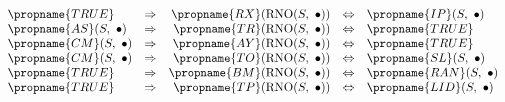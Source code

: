 \[
\begin{array}{lcrcl} 
\propname{TRUE}
	& \Rightarrow
	& \propname{RX}(\mathrm{RNO}(S,\ \bullet)) 
    & \Leftrightarrow
    & \propname{IP}(S,\ \bullet)  \\
\propname{AS}(S,\ \bullet)
	& \Rightarrow
	& \propname{TR}(\mathrm{RNO}(S,\ \bullet))
    & \Leftrightarrow
    & \propname{TRUE} \\
\propname{CM}(S,\ \bullet)
	& \Rightarrow
	& \propname{AY}(\mathrm{RNO}(S,\ \bullet))
    & \Leftrightarrow
    & \propname{TRUE} \\ 
\propname{CM}(S,\ \bullet)
	& \Rightarrow
	& \propname{TO}(\mathrm{RNO}(S,\ \bullet))
    & \Leftrightarrow
    & \propname{SL}(S,\ \bullet) \\
\propname{TRUE}
	& \Rightarrow
	& \propname{BM}(\mathrm{RNO}(S,\ \bullet))
    & \Leftrightarrow
    & \propname{RAN}(S,\ \bullet) \\ 
\propname{TRUE}
	& \Rightarrow
	& \propname{TP}(\mathrm{RNO}(S,\ \bullet))
    & \Leftrightarrow
    & \propname{LID}(S,\ \bullet) \\ 
\end{array} 
\] 
